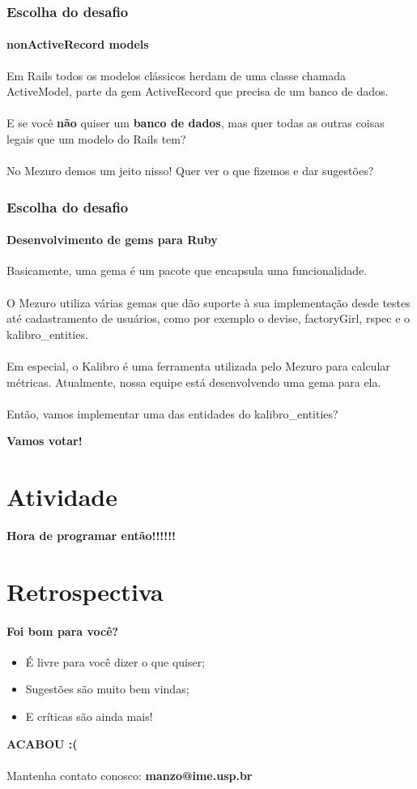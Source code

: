 \documentclass{beamer}
\begin{document}
\begin{frame}
  \frametitle{Escolha do desafio}
  \framesubtitle{nonActiveRecord models}

  Em Rails todos os modelos clássicos herdam de uma classe chamada ActiveModel, parte da gem ActiveRecord que precisa de um banco de dados. \\~\\

  E se você \textbf{não} quiser um \textbf{banco de dados}, mas quer todas as outras coisas legais que um modelo do Rails tem? \\~\\

  No Mezuro demos um jeito nisso! Quer ver o que fizemos e dar sugestões?
\end{frame}

\begin{frame}
  \frametitle{Escolha do desafio}
  \framesubtitle{Desenvolvimento de gems para Ruby}

  Basicamente, uma gema é um pacote que encapsula uma funcionalidade. \\~\\
  O Mezuro utiliza várias gemas que dão suporte à sua implementação desde testes até cadastramento de usuários, como por exemplo o devise, factoryGirl, rspec e o kalibro\_entities.\\~\\ 
  Em especial, o Kalibro é uma ferramenta utilizada pelo Mezuro para calcular métricas. Atualmente, nossa equipe está desenvolvendo uma gema para ela. \\~\\
  Então, vamos implementar uma das entidades do kalibro\_entities?
  
\end{frame}

\begin{frame}
  \LARGE{\textbf{Vamos votar!}}
\end{frame}

\section{Atividade}
\begin{frame}
  \LARGE{\textbf{Hora de programar então!!!!!!}}
\end{frame}

\section{Retrospectiva}
\begin{frame}
  \framesubtitle{Foi bom para você?}

  \begin{itemize}
    \item É livre para você dizer o que quiser;
    \item Sugestões são muito bem vindas;
    \item E críticas são ainda mais!
  \end{itemize}
\end{frame}

\begin{frame}
  \LARGE{\textbf{ACABOU :(}} \\~\\

  Mantenha contato conosco:
  \textbf{manzo@ime.usp.br}
\end{frame}
\end{document}
